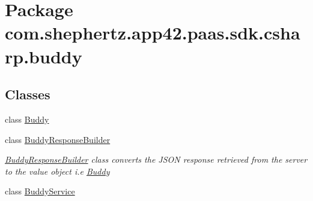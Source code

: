 \hypertarget{namespacecom_1_1shephertz_1_1app42_1_1paas_1_1sdk_1_1csharp_1_1buddy}{\section{Package com.\+shephertz.\+app42.\+paas.\+sdk.\+csharp.\+buddy}
\label{namespacecom_1_1shephertz_1_1app42_1_1paas_1_1sdk_1_1csharp_1_1buddy}
}
\subsection*{Classes}
\begin{DoxyCompactItemize}
\item 
class \hyperlink{classcom_1_1shephertz_1_1app42_1_1paas_1_1sdk_1_1csharp_1_1buddy_1_1_buddy}{Buddy}
\item 
class \hyperlink{classcom_1_1shephertz_1_1app42_1_1paas_1_1sdk_1_1csharp_1_1buddy_1_1_buddy_response_builder}{Buddy\+Response\+Builder}
\begin{DoxyCompactList}\small\item\em \hyperlink{classcom_1_1shephertz_1_1app42_1_1paas_1_1sdk_1_1csharp_1_1buddy_1_1_buddy_response_builder}{Buddy\+Response\+Builder} class converts the J\+S\+O\+N response retrieved from the server to the value object i.\+e \hyperlink{classcom_1_1shephertz_1_1app42_1_1paas_1_1sdk_1_1csharp_1_1buddy_1_1_buddy}{Buddy} \end{DoxyCompactList}\item 
class \hyperlink{classcom_1_1shephertz_1_1app42_1_1paas_1_1sdk_1_1csharp_1_1buddy_1_1_buddy_service}{Buddy\+Service}
\end{DoxyCompactItemize}
